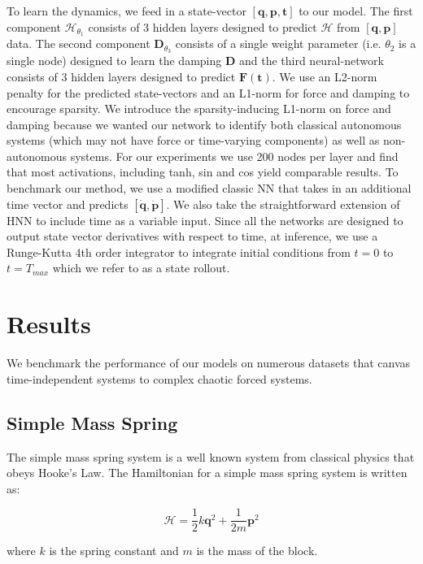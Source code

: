 \documentclass[twoside]{article}
\begin{document}
To learn the dynamics, we feed in a state-vector $ [\mathbf{q},\mathbf{p},\mathbf{t}]$ to our model. The first component $\mathcal{H}_{\theta_1}$ consists of 3 hidden layers designed to predict $\mathcal{H}$ from $[\mathbf{q},\mathbf{p}]$ data. The second component $\mathbf{D}_{\theta_3}$ consists of a single weight parameter (i.e. $\theta_2$ is a single node) designed to learn the damping $\mathbf{D}$ and the third neural-network consists of 3 hidden layers designed to predict $\mathbf{F(\mathbf{t})}$. We use an L2-norm penalty for the predicted state-vectors and an L1-norm for force and damping to encourage sparsity. We introduce the sparsity-inducing L1-norm on force and damping because we wanted our network to identify both classical autonomous systems (which may not have force or time-varying components) as well as non-autonomous systems. For our experiments we use 200 nodes per layer and find that most activations, including tanh, sin and cos yield comparable results. To benchmark our method, we use a modified classic NN that takes in an additional time vector and predicts $[\dot{\mathbf{q}},\dot{\mathbf{p}}]$. We also take the straightforward extension of HNN to include time as a variable input. Since all the networks are designed to output state vector derivatives with respect to time, at inference, we use a Runge-Kutta 4th order integrator to integrate initial conditions from $t=0$ to $t=T_{max}$ which we refer to as a state rollout. 


\section{Results}

We benchmark the performance of our models on numerous datasets that canvas time-independent systems to complex chaotic forced systems. 

\subsection{Simple Mass Spring}

The simple mass spring system is a well known system from classical physics that obeys Hooke's Law. The Hamiltonian for a simple mass spring system is written as:

\begin{equation}
\mathcal{H} = \frac{1}{2}k\mathbf{q}^2 + \frac{1}{2m}\mathbf{p}^2 
\end{equation}

where $k$ is the spring constant and $m$ is the mass of the block. 
\end{document}
